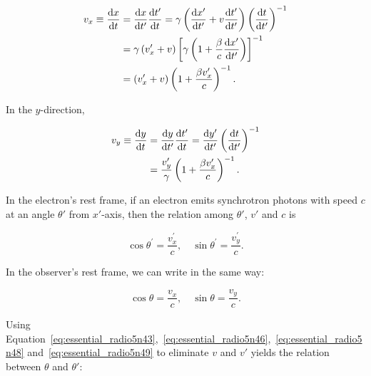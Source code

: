 \begin{equation}\label{eq:essential_radio5n43}
    \begin{aligned}
        v_x \equiv \frac{\mathrm{d} x}{\mathrm{d} t} &= \frac{\mathrm{d} x}{\mathrm{d} t^{\prime}} \frac{\mathrm{d} t^{\prime}}{\mathrm{d} t}=\gamma\left(\frac{\mathrm{d} x^{\prime}}{\mathrm{d} t^{\prime}}+v \frac{\mathrm{d} t^{\prime}}{\mathrm{d} t^{\prime}}\right)\left(\frac{\mathrm{d} t}{\mathrm{d} t^{\prime}}\right)^{-1} \\
                                       &=\gamma\left(v_x^{\prime}+v\right)\left[\gamma\left(1+\frac{\beta}{c} \frac{\mathrm{d} x^{\prime}}{\mathrm{d} t^{\prime}}\right)\right]^{-1} \\
                                       &=\left(v_x^{\prime}+v\right)\left(1+\frac{\beta v_x^{\prime}}{c}\right)^{-1}.
    \end{aligned}
\end{equation}

In the $y$-direction,

\begin{equation}\label{eq:essential_radio5n46}
    \begin{aligned}
        v_y \equiv \frac{\mathrm{d} y}{\mathrm{d} t} &= \frac{\mathrm{d} y}{\mathrm{d} t^{\prime}} \frac{\mathrm{d} t^{\prime}}{\mathrm{d} t}=\frac{\mathrm{d} y^{\prime}}{\mathrm{d} t^{\prime}}\left(\frac{\mathrm{d} t}{\mathrm{d} t^{\prime}}\right)^{-1} \\
                                       &= \frac{v_y^{\prime}}{\gamma}\left(1+\frac{\beta v_x^{\prime}}{c}\right)^{-1}.
    \end{aligned}
\end{equation}

In the electron's rest frame, if an electron emits synchrotron photons with speed $c$ at an angle $\theta'$ from $x'$-axis, then the relation among $\theta'$, $v'$ and $c$ is

\begin{equation}\label{eq:essential_radio5n48}
    \cos \theta^{\prime}=\frac{v_x^{\prime}}{c}, \quad \sin \theta^{\prime}=\frac{v_y^{\prime}}{c}.
\end{equation}

In the observer's rest frame, we can write in the same way:

\begin{equation}\label{eq:essential_radio5n49}
    \cos \theta=\frac{v_x}{c}, \quad \sin \theta=\frac{v_y}{c}.
\end{equation}

Using Equation~\ref{eq:essential_radio5n43},~\ref{eq:essential_radio5n46},~\ref{eq:essential_radio5n48} and~\ref{eq:essential_radio5n49} to eliminate $v$ and $v'$ yields the relation between $\theta$ and $\theta'$:

